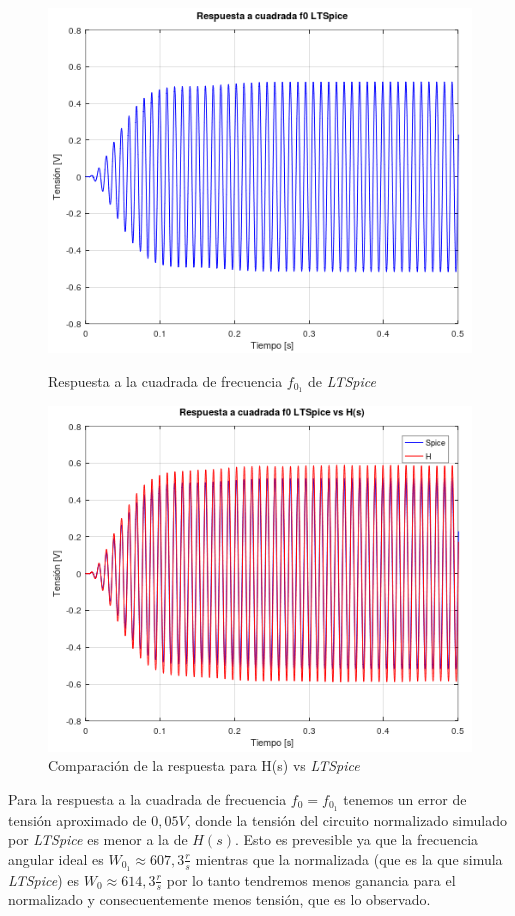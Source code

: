 \documentclass[11pt,a4paper]{report}
\begin{document}
\begin{figure}[h!]
\centering
\includegraphics[scale=0.8]{rtaCuadradaMedio1Spice.png}
\caption{Respuesta a la cuadrada de frecuencia $f_{0_{1}}$ de \textit{LTSpice}}
\includegraphics[scale=0.8]{rtaCuadradaMedio1SpiceComp.png}
\caption{Comparación de la respuesta para H(s) vs \textit{LTSpice}}
\end{figure}

Para la respuesta a la cuadrada de frecuencia $f_{0} = f_{0_{1}}$ tenemos un error de tensión aproximado de $0,05V$, donde la tensión del circuito normalizado simulado por \textit{LTSpice} es menor a la de $H(s)$. Esto es prevesible ya que la frecuencia angular ideal es $W_{0_{1}} \approx 607,3\frac{r}{s}$ mientras que la normalizada (que es la que simula \textit{LTSpice}) es $W_{0} \approx 614,3\frac{r}{s}$ por lo tanto tendremos menos ganancia para el normalizado y consecuentemente menos tensión, que es lo observado.
\end{document}
